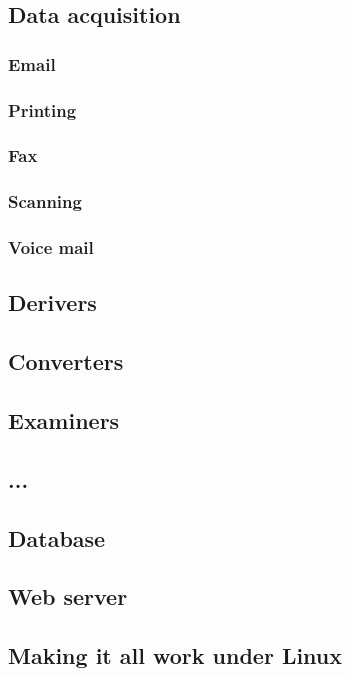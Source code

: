 \subsection{Data acquisition}




\subsubsection{Email}
\subsubsection{Printing}
\subsubsection{Fax}
\subsubsection{Scanning}
\subsubsection{Voice mail}

\subsection{Derivers}

\subsection{Converters}

\subsection{Examiners}

\subsection{...}


\subsection{Database}

\subsection{Web server}

\subsection{Making it all work under Linux}
   
